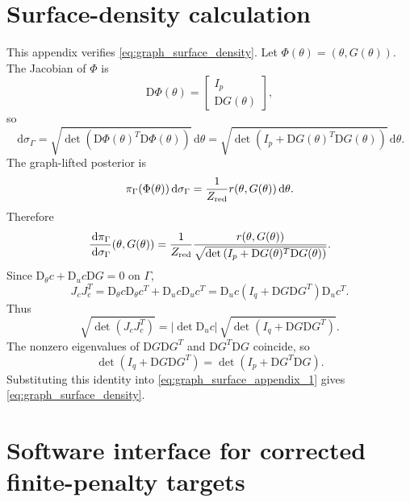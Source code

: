 \documentclass[11pt]{article}
\newcommand{\dd}{\,\mathrm{d}}
\newcommand{\D}{\mathrm{D}}
\newcommand{\abs}[1]{\left\lvert #1\right\rvert}
\newcommand{\sdet}[1]{\sqrt{\det\left(#1\right)}}
\begin{document}
\appendix

\section{Surface-density calculation}
\label{app:surface_density}

This appendix verifies \eqref{eq:graph_surface_density}. Let \(\Phi(\theta)=(\theta,G(\theta))\). The Jacobian of \(\Phi\) is
\begin{equation}
 \D\Phi(\theta) =
 \begin{bmatrix}
 I_p\\\D G(\theta)
 \end{bmatrix},
\end{equation}
so
\begin{equation}
 \dd\sigma_\Gamma
 =
 \sdet{\D\Phi(\theta)^T\D\Phi(\theta)}\dd\theta
 =
 \sdet{I_p+\D G(\theta)^T\D G(\theta)}\dd\theta.
\end{equation}
The graph-lifted posterior is
\begin{equation}
 \pi_\Gamma(\Phi(\theta))\dd\sigma_\Gamma
 =
 \frac{1}{Z_{\rm red}}r(\theta,G(\theta))\dd\theta.
\end{equation}
Therefore
\begin{equation}
 \frac{\dd\pi_\Gamma}{\dd\sigma_\Gamma}(\theta,G(\theta))
 =
 \frac{1}{Z_{\rm red}}
 \frac{r(\theta,G(\theta))}{\sdet{I_p+\D G(\theta)^T\D G(\theta)}}.
 \label{eq:graph_surface_appendix_1}
\end{equation}
Since \(\D_\theta c + \D_u c\D G=0\) on \(\Gamma\),
\begin{equation}
 J_cJ_c^T
 =
 \D_\theta c\D_\theta c^T + \D_u c\D_u c^T
 =
 \D_u c\left(I_q + \D G\D G^T\right)\D_u c^T.
\end{equation}
Thus
\begin{equation}
 \sdet{J_cJ_c^T}
 =
 \abs{\det\D_u c}\,
 \sdet{I_q+\D G\D G^T}.
\end{equation}
The nonzero eigenvalues of \(\D G\D G^T\) and \(\D G^T\D G\) coincide, so
\begin{equation}
 \det(I_q+\D G\D G^T)=\det(I_p+\D G^T\D G).
\end{equation}
Substituting this identity into \eqref{eq:graph_surface_appendix_1} gives \eqref{eq:graph_surface_density}.


\section{Software interface for corrected finite-penalty targets}
\label{app:detcorr_api}
\end{document}

